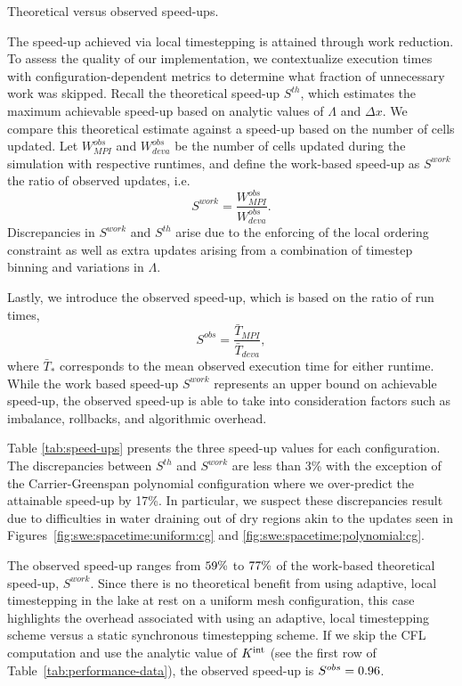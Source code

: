 \begin{table}
{\footnotesize
\caption{Theoretical versus observed speed-ups.}
\label{tab:speed-ups}
  \centering

}
\end{table}
The speed-up achieved via local timestepping is attained through work reduction. 
To assess the quality of our implementation, we contextualize execution times with configuration-dependent metrics to determine what fraction of unnecessary work was skipped. 
Recall the theoretical speed-up $S^{th}$, which estimates the maximum achievable speed-up based on analytic values of $\Lambda$ and $\Delta x$. We compare this theoretical estimate against a speed-up based on the number of cells updated.
 Let $W^{obs}_{MPI}$ and $W^{obs}_{deva}$ be the number of cells updated during the simulation with respective runtimes, and define the work-based speed-up as $S^{work}$ the ratio of observed updates, i.e.
\begin{equation*}
S^{work} = \frac{W^{obs}_{MPI}}{W^{obs}_{deva}}.
\end{equation*}
Discrepancies in $S^{work}$ and $S^{th}$ arise due to the enforcing of the local ordering constraint as well as extra updates arising from a combination of timestep binning and variations in $\Lambda$.

Lastly, we introduce the observed speed-up, which is based on the ratio of run times,
\begin{equation*}
S^{obs} = \frac{ \bar{T}_{MPI} }{\bar{T}_{deva}},
\end{equation*} 
where $\bar{T}_*$ corresponds to the mean observed execution time for either runtime. While the work based speed-up $S^{work}$ represents an upper bound on achievable speed-up, the observed speed-up is able to take into consideration factors such as imbalance, rollbacks, and algorithmic overhead.

Table \ref{tab:speed-ups} presents the three speed-up values for each configuration. The discrepancies between $S^{th}$ and $S^{work}$ are less than 3\% with the exception of the Carrier-Greenspan polynomial configuration where we over-predict the attainable speed-up by 17\%. In particular, we suspect these discrepancies result due to difficulties in water draining out of dry regions akin to the updates seen in Figures~\ref{fig:swe:spacetime:uniform:cg} and \ref{fig:swe:spacetime:polynomial:cg}.

 The observed speed-up ranges from $59\%$ to $77\%$ of the work-based theoretical speed-up, $S^{work}$. 
 Since there is no theoretical benefit from using adaptive, local timestepping in the lake at rest on a uniform mesh configuration, this case highlights the overhead associated with using an adaptive, local timestepping scheme versus a static synchronous timestepping scheme. If we skip the CFL computation and use the analytic value of $K^{\text{int}}$ (see the first row of Table~\ref{tab:performance-data}), the observed speed-up is  $S^{obs}=0.96$. 

